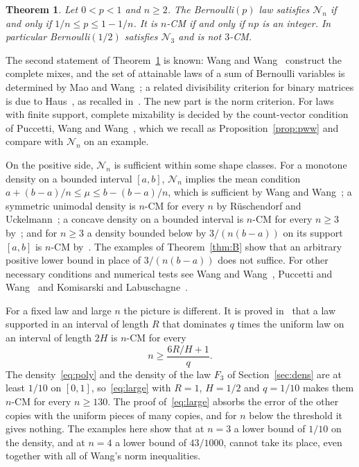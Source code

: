 \documentclass[11pt]{amsart}
\newtheorem{theorem}{Theorem}[section]
\theoremstyle{definition}
\newcommand{\cN}{\mathcal{N}}
\begin{document}
\begin{theorem}\label{thm:C}
Let $0<p<1$ and $n\ge2$. The Bernoulli$(p)$ law satisfies $\cN_n$ if and only if $1/n\le p\le1-1/n$. It is $n$-CM
if and only if $np$ is an integer. In particular Bernoulli$(1/2)$ satisfies $\cN_3$ and is not $3$-CM.
\end{theorem}

The second statement of Theorem~\ref{thm:C} is known: Wang and Wang~\cite[Proposition~2.3]{WW11} construct the
complete mixes, and the set of attainable laws of a sum of Bernoulli variables is determined by Mao and
Wang~\cite[Example~3.1]{MW15}; a related divisibility criterion for binary matrices is due to Haus~\cite{Haus15}, as recalled
in~\cite[Theorem~1]{BKP}. The new part is the norm criterion. For laws with finite support, complete
mixability is decided by the count-vector condition of Puccetti, Wang and Wang~\cite[Theorem~3.2(b)]{PWW12}, which
we recall as Proposition~\ref{prop:pww} and compare with $\cN_n$ on an example.

On the positive side, $\cN_n$ is sufficient within some shape classes. For a monotone density on a bounded interval
$[a,b]$, $\cN_n$ implies the mean condition $a+(b-a)/n\le\mu\le b-(b-a)/n$, which is sufficient by Wang and
Wang~\cite[Theorem~2.4]{WW11}; a symmetric unimodal density is $n$-CM for every $n$ by Rüschendorf and
Uckelmann~\cite{RU02}; a concave density on a bounded interval is $n$-CM for every $n\ge3$ by~\cite[Theorem~4.2]{PWW12}; and for $n\ge3$ a density
bounded below by $3/(n(b-a))$ on its support $[a,b]$ is $n$-CM by~\cite[Theorem~3.4]{PWW13}. The examples of Theorem~\ref{thm:B} show
that an arbitrary positive lower bound in place of $3/(n(b-a))$ does not suffice. For other necessary conditions and
numerical tests see Wang and Wang~\cite{WW16}, Puccetti and Wang~\cite{PW15} and Komisarski and Labuschagne~\cite{KL}.

For a fixed law and large $n$ the picture is different. It is proved in~\cite[Theorem~1.2]{ShLarge} that a law supported in an
interval of length $R$ that dominates $q$ times the uniform law on an interval of length $2H$ is $n$-CM for every
\begin{equation}\label{eq:large}
n\ge\frac{6R/H+1}{q}.
\end{equation}
The density~\eqref{eq:poly} and the density of the law $F_3$ of Section~\ref{sec:dens} are at least $1/10$ on
$[0,1]$, so~\eqref{eq:large} with $R=1$, $H=1/2$ and $q=1/10$ makes them $n$-CM for every $n\ge130$. The proof
of~\eqref{eq:large} absorbs the error of the other copies with the uniform pieces of many copies, and for $n$ below
the threshold it gives nothing. The examples here show that at $n=3$ a lower bound of $1/10$ on the density, and at
$n=4$ a lower bound of $43/1000$, cannot take its place, even together with all of Wang's norm inequalities.
\end{document}
